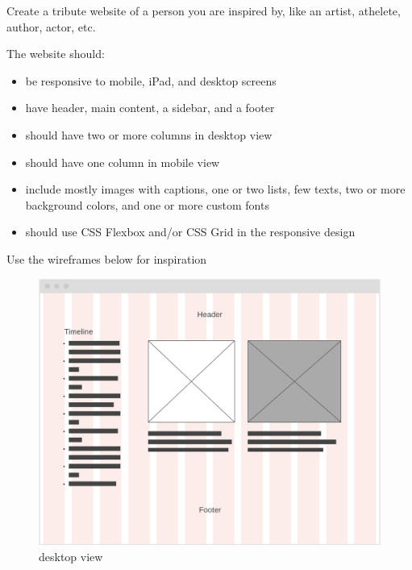 \documentclass{42-en}
\begin{document}
Create a tribute website of a person you are inspired by, like an artist, athelete, author, actor, etc. \par
\vspace{.1in}
The website should:
\begin{itemize}
    \item be responsive to mobile, iPad, and desktop screens
    \item have header, main content, a sidebar, and a footer
    \item should have two or more columns in desktop view
    \item should have one column in mobile view
    \item include mostly images with captions, one or two lists, few texts, two or more background colors, and one or more custom fonts
    \item should use CSS Flexbox and/or CSS Grid in the responsive design
\end{itemize}
\vspace{.5in}
Use the wireframes below for inspiration
\begin{figure}[H]
    \begin{center}
        \includegraphics[width=12cm]{wireframe_desktop.png}\\
        desktop view
    \end{center}
\end{figure}
    
\end{document}

